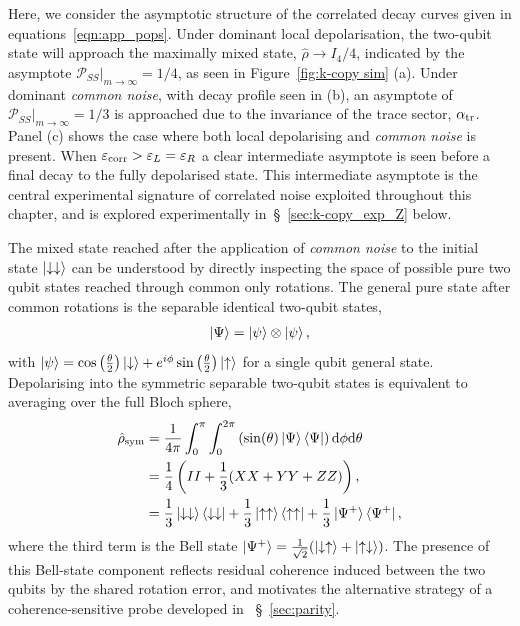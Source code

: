 Here, we consider the asymptotic structure of the correlated decay curves given in equations~\ref{eqn:app_pops}. Under dominant local depolarisation, the two-qubit state will approach the maximally mixed state, $\hat\rho\rightarrow I_4/4$, indicated by the asymptote
$\mathcal{P}_{SS}\lvert_{m\to\infty} = 1/4$, as seen in Figure~\ref{fig:k-copy sim} (a).
Under dominant \emph{common noise}, with decay profile seen in (b), an asymptote of
$\mathcal{P}_{SS}\lvert_{m\to\infty} = 1/3$ is approached due to the invariance of the trace sector, $\alpha_{\rm tr}$.
Panel (c) shows the case where both local depolarising and \emph{common noise} is present. When $\varepsilon_{\rm corr}>\varepsilon_{L}=\varepsilon_{R}$ a clear intermediate asymptote is seen before a final decay to
the fully depolarised state. This intermediate asymptote is the central
experimental signature of correlated noise exploited throughout this
chapter, and is explored experimentally in~\S~\ref{sec:k-copy_exp_Z} below.


The mixed state reached after the application of \emph{common noise} to the initial state $\ket{\downarrow\downarrow}$ can be understood by directly inspecting the space of possible pure two qubit states reached through common only rotations. The general pure state after common rotations is the separable identical two-qubit states,
\begin{equation}
\begin{split}
\ket{\Psi} &=\ket{\psi}\otimes\ket{\psi},\\
\end{split}
\end{equation}
with $\ket{\psi}=\cos\left(\frac{\theta}{2}\right)\ket{\downarrow}+e^{i\phi}\sin\left(\frac{\theta}{2}\right)\ket{\uparrow}$ for a single qubit general state.
Depolarising into the symmetric separable two-qubit states is equivalent to averaging over the full Bloch sphere,
\begin{equation}
    \label{eqn:rho_sym}
\begin{split}
    \hat\rho_\mathrm{sym}&=\frac{1}{4\pi}\int_0^\pi\int_0^{2\pi}\left(\sin(\theta)\ket{\Psi}\bra{\Psi}\right)\mathrm{d}\phi\mathrm{d}\theta\\
    &=\frac{1}{4}\left(II+\frac{1}{3}(XX+YY+ZZ)\right),\\
    &=\frac{1}{3}\ket{\downarrow\downarrow}\bra{\downarrow\downarrow}+\frac{1}{3}\ket{\uparrow\uparrow}\bra{\uparrow\uparrow}+\frac{1}{3}\ket{\Psi^+}\bra{\Psi^+},
    \end{split}
\end{equation}
where the third term is the Bell state $\ket{\Psi^+} = \frac{1}{\sqrt{2}}(\ket{\downarrow\uparrow}+\ket{\uparrow\downarrow})$.
The presence of this Bell-state component reflects residual coherence
induced between the two qubits by the shared rotation error, and motivates
the alternative strategy of a coherence-sensitive probe developed in
~\S~\ref{sec:parity}.



